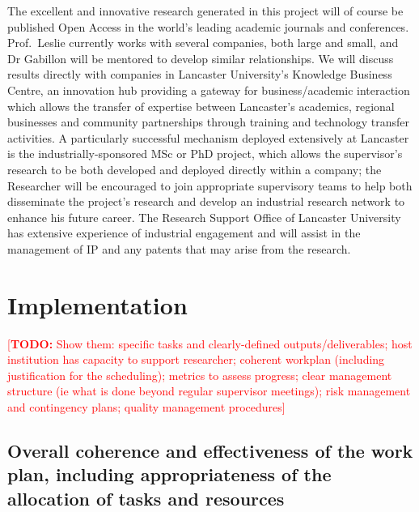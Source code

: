 \documentclass[a4paper,11pt]{article}
\newcommand{\TODO}[1]{{\textcolor{red}{[\textbf{TODO:} #1]}}}
\begin{document}
The excellent and innovative research generated in this project will of course be published Open Access in the world's leading academic journals and conferences.  Prof.\ Leslie currently works with several companies, both large and small, and Dr Gabillon will be mentored to develop similar relationships.  We will discuss results directly with companies in Lancaster University's Knowledge Business Centre, an innovation hub providing a gateway for business/academic interaction which allows the transfer of expertise between Lancaster's academics, regional businesses and community partnerships through training and technology transfer activities.  A particularly successful mechanism deployed extensively at Lancaster is the industrially-sponsored MSc or PhD project, which allows the supervisor's research to be both developed and deployed directly within a company; the Researcher will be encouraged to join appropriate supervisory teams to help both disseminate the project's research and develop an industrial research network to enhance his future career.  The Research Support Office of Lancaster University has extensive experience of industrial engagement and will assist in the management of IP and any patents that may arise from the research.

\section{Implementation}
\label{sec:implementation}

\TODO{Show them: specific tasks and clearly-defined outputs/deliverables; host institution has capacity to support researcher; coherent workplan (including justification for the scheduling); metrics to assess progress; clear management structure (ie what is done beyond regular supervisor meetings); risk management and contingency plans; quality management procedures}

\subsection{Overall coherence and effectiveness of the work plan, including appropriateness of the allocation of tasks and resources}
\end{document}
